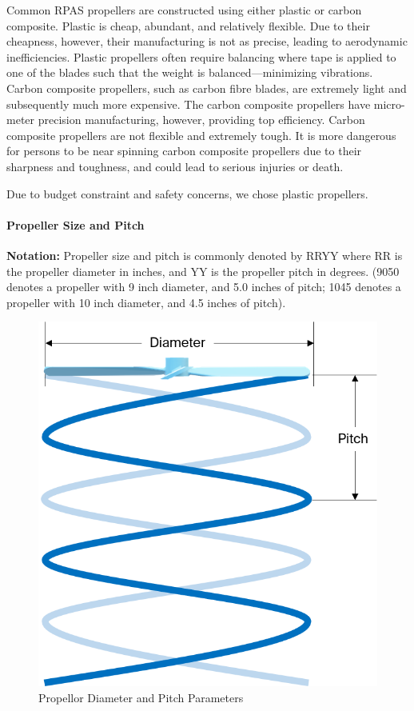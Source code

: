 Common RPAS propellers are constructed using either plastic or carbon composite. Plastic is cheap, abundant, 
and relatively flexible. Due to their cheapness, however, their manufacturing is not as precise, leading to 
aerodynamic inefficiencies. Plastic propellers often require balancing where tape is applied to one of the 
blades such that the weight is balanced---minimizing vibrations. Carbon composite propellers, such as 
carbon fibre blades, are extremely light and subsequently much more expensive. The carbon composite 
propellers have micro-meter precision manufacturing, however, providing top efficiency. Carbon composite 
propellers are not flexible and extremely tough. It is more dangerous for persons to be near spinning 
carbon composite propellers due to their sharpness and toughness, and could lead to serious injuries or death.

Due to budget constraint and safety concerns, we chose plastic propellers.

\paragraph{Propeller Size and Pitch}

\textbf{Notation: } Propeller size and pitch is commonly denoted by RRYY where RR is the propeller diameter in inches, and YY is the propeller pitch in degrees. (9050 denotes a propeller with 9 inch diameter, and 5.0 inches of pitch; 1045 denotes a propeller with 10 inch diameter, and 4.5 inches of pitch).

\begin{figure}[H]
    \centering
    \includegraphics[scale=0.5]{img/proppitch}
    \caption{Propellor Diameter and Pitch Parameters}
    \label{fig:propeller}
\end{figure}

